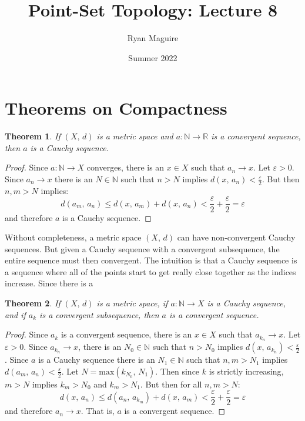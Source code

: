 \documentclass{article}
\title{Point-Set Topology: Lecture 8}
\author{Ryan Maguire}
\date{Summer 2022}
\theoremstyle{plain}
\newtheorem{theorem}{Theorem}[section]
\theoremstyle{normal}
\begin{document}
    \maketitle
    \section{Theorems on Compactness}
        \begin{theorem}
            If $(X,\,d)$ is a metric space and
            $a:\mathbb{N}\rightarrow\mathbb{R}$ is a convergent sequence,
            then $a$ is a Cauchy sequence.
        \end{theorem}
        \begin{proof}
            Since $a:\mathbb{N}\rightarrow{X}$ converges, there is an
            $x\in{X}$ such that $a_{n}\rightarrow{x}$. Let
            $\varepsilon>0$. Since $a_{n}\rightarrow{x}$ there is an
            $N\in\mathbb{N}$ such that $n>N$ implies
            $d(x,\,a_{n})<\frac{\varepsilon}{2}$. But then $n,m>N$ implies:
            \begin{equation}
                d(a_{m},\,a_{n})\leq{d}(x,\,a_{m})+d(x,\,a_{n})
                    <\frac{\varepsilon}{2}+\frac{\varepsilon}{2}
                    =\varepsilon
            \end{equation}
            and therefore $a$ is a Cauchy sequence.
        \end{proof}
        Without completeness, a metric space $(X,\,d)$ can have non-convergent
        Cauchy sequences. But given a Cauchy sequence with a convergent
        subsequence, the entire sequence must then convergent. The intuition is
        that a Cauchy sequence is a sequence where all of the points start to
        get really close together as the indices increase. Since there is a
        \begin{theorem}
            If $(X,\,d)$ is a metric space, if $a:\mathbb{N}\rightarrow{X}$
            is a Cauchy sequence, and if $a_{k}$ is a convergent subsequence,
            then $a$ is a convergent sequence.
        \end{theorem}
        \begin{proof}
            Since $a_{k}$ is a convergent sequence, there is an
            $x\in{X}$ such that $a_{k_{n}}\rightarrow{x}$. Let
            $\varepsilon>0$. Since $a_{k_{n}}\rightarrow{x}$, there is an
            $N_{0}\in\mathbb{N}$ such that $n>N_{0}$ implies
            $d(x,\,a_{k_{n}})<\frac{\varepsilon}{2}$. Since $a$ is a Cauchy
            sequence there is an $N_{1}\in\mathbb{N}$ such that
            $n,m>N_{1}$ implies $d(a_{m},\,a_{n})<\frac{\varepsilon}{2}$.
            Let $N=\textrm{max}(k_{N_{0}},\,N_{1})$.
            Then since $k$ is strictly increasing,
            $m>N$ implies $k_{m}>N_{0}$ and $k_{m}>N_{1}$.
            But then for all $n,m>N$:
            \begin{equation}
                d(x,\,a_{n})\leq{d}(a_{n},\,a_{k_{m}})+d(x,\,a_{m})
                    <\frac{\varepsilon}{2}+\frac{\varepsilon}{2}=\varepsilon
            \end{equation}
            and therefore $a_{n}\rightarrow{x}$. That is, $a$ is a convergent
            sequence.
        \end{proof}
\end{document}
